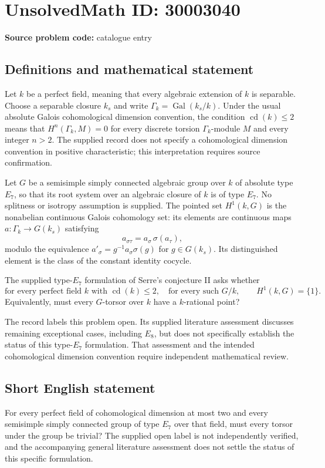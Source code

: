 \documentclass[11pt]{article}
\begin{document}
\section*{UnsolvedMath ID: 30003040}
\textbf{Source problem code:} catalogue entry
\subsection{Definitions and mathematical statement}
Let \(k\) be a perfect field, meaning that every algebraic extension of \(k\) is separable. Choose a separable closure \(k_s\) and write \(\Gamma_k=\operatorname{Gal}(k_s/k)\). Under the usual absolute Galois cohomological dimension convention, the condition \(\operatorname{cd}(k)\leq 2\) means that \(H^n(\Gamma_k,M)=0\) for every discrete torsion \(\Gamma_k\)-module \(M\) and every integer \(n>2\). The supplied record does not specify a cohomological dimension convention in positive characteristic; this interpretation requires source confirmation.

Let \(G\) be a semisimple simply connected algebraic group over \(k\) of absolute type \(E_7\), so that its root system over an algebraic closure of \(k\) is of type \(E_7\). No splitness or isotropy assumption is supplied. The pointed set \(H^1(k,G)\) is the nonabelian continuous Galois cohomology set: its elements are continuous maps \(a\colon\Gamma_k\to G(k_s)\) satisfying
\[
 a_{\sigma\tau}=a_\sigma\,\sigma(a_\tau),
\]
modulo the equivalence \(a'_{\sigma}=g^{-1}a_\sigma\sigma(g)\) for \(g\in G(k_s)\). Its distinguished element is the class of the constant identity cocycle.

The supplied type-\(E_7\) formulation of Serre's conjecture II asks whether
\[
 \text{for every perfect field }k\text{ with }\operatorname{cd}(k)\leq 2,
 \quad\text{for every such }G/k,
 \qquad H^1(k,G)=\{1\}.
\]
Equivalently, must every \(G\)-torsor over \(k\) have a \(k\)-rational point?

The record labels this problem open. Its supplied literature assessment discusses remaining exceptional cases, including \(E_8\), but does not specifically establish the status of this type-\(E_7\) formulation. That assessment and the intended cohomological dimension convention require independent mathematical review.
\subsection{Short English statement}
For every perfect field of cohomological dimension at most two and every semisimple simply connected group of type \(E_7\) over that field, must every torsor under the group be trivial? The supplied open label is not independently verified, and the accompanying general literature assessment does not settle the status of this specific formulation.
\end{document}
